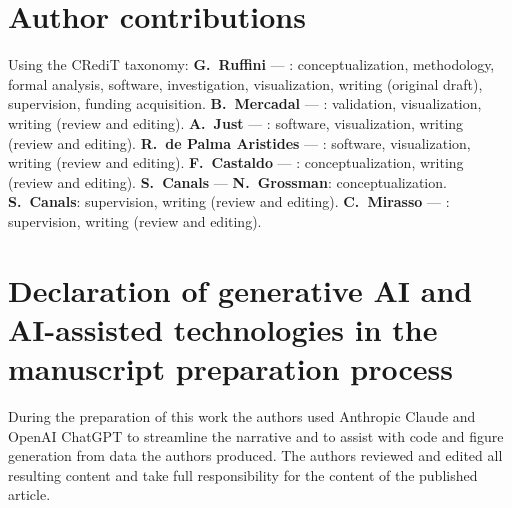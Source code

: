 \documentclass[11pt,a4paper]{article}
\providecommand{\DIFaddtex}[1]{{\protect\color{blue} \sf #1}} %
\providecommand{\DIFdeltex}[1]{{\protect\color{red} \scriptsize #1}} %
\providecommand{\DIFaddbegin}{} %
\providecommand{\DIFaddend}{} %
\providecommand{\DIFdelbegin}{} %
\providecommand{\DIFdelend}{} %
\providecommand{\DIFadd}[1]{\texorpdfstring{\DIFaddtex{#1}}{#1}} %
\providecommand{\DIFdel}[1]{\texorpdfstring{\DIFdeltex{#1}}{}} %
\begin{document}
\section*{Author contributions}
Using the CRediT taxonomy: \textbf{G.~Ruffini}\DIFdelbegin \DIFdel{--- }\DIFdelend \DIFaddbegin \DIFadd{: }\DIFaddend conceptualization, methodology, formal
analysis, software, investigation, visualization, writing (original draft), supervision,
funding acquisition. \textbf{B.~Mercadal}\DIFdelbegin \DIFdel{--- }\DIFdelend \DIFaddbegin \DIFadd{: }\DIFaddend validation, visualization, writing (review
and editing). \textbf{A.~Just}\DIFdelbegin \DIFdel{--- }\DIFdelend \DIFaddbegin \DIFadd{: }\DIFaddend software, visualization, writing (review and editing).
\textbf{R.~de Palma Aristides}\DIFdelbegin \DIFdel{--- }\DIFdelend \DIFaddbegin \DIFadd{: }\DIFaddend software, visualization, writing (review and editing).
\textbf{F.~Castaldo}\DIFdelbegin \DIFdel{--- }\DIFdelend \DIFaddbegin \DIFadd{: }\DIFaddend conceptualization, writing (review and editing).
\DIFdelbegin \DIFdel{\textbf{S.~Canals} --- }\DIFdelend \DIFaddbegin \DIFadd{\textbf{N.~Grossman}: conceptualization.
\textbf{S.~Canals}: }\DIFaddend supervision, writing (review and editing).
\textbf{C.~Mirasso}\DIFdelbegin \DIFdel{--- }\DIFdelend \DIFaddbegin \DIFadd{: }\DIFaddend supervision, writing (review and editing).
\fi

\section*{Declaration of generative AI and AI-assisted technologies in the manuscript
preparation process}
During the preparation of this work the authors used Anthropic Claude and OpenAI ChatGPT to
streamline the narrative and to assist with code and figure generation from data the authors
produced. The authors reviewed and edited all resulting content and take full responsibility
for the content of the published article.



\end{document}
